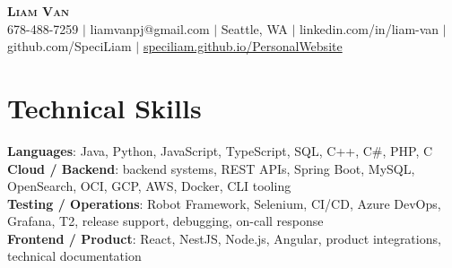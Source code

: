\documentclass[letterpaper,11pt]{article}
\begin{document}

%
\begin{center}
    \textbf{\Huge \scshape Liam Van} \\ \vspace{1pt}
    \small 678-488-7259 $|$ \small {liamvanpj@gmail.com} $|$ Seattle, WA
 {{$|$ linkedin.com/in/liam-van} {$|$ github.com/SpeciLiam} {$|$ \href{https://speciliam.github.io/PersonalWebsite}{speciliam.github.io/PersonalWebsite}}}

\end{center}

\section{Technical Skills}
 \begin{itemize}[leftmargin=0.15in, label={}]
    \small{\item{
     \textbf{Languages}{: Java, Python, JavaScript, TypeScript, SQL, C++, C\#, PHP, C} \\
     \textbf{Cloud / Backend}{: backend systems, REST APIs, Spring Boot, MySQL, OpenSearch, OCI, GCP, AWS, Docker, CLI tooling} \\
     \textbf{Testing / Operations}{: Robot Framework, Selenium, CI/CD, Azure DevOps, Grafana, T2, release support, debugging, on-call response} \\
     \textbf{Frontend / Product}{: React, NestJS, Node.js, Angular, product integrations, technical documentation} \\
    }}
 \end{itemize}
%
\end{document}
